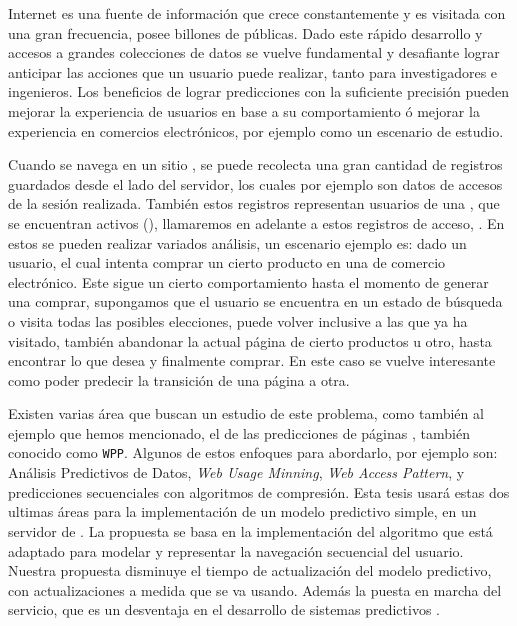 %
%
%
Internet es una fuente de información que crece constantemente y es visitada con una gran frecuencia, posee billones de \webs públicas. Dado este rápido desarrollo y accesos a grandes colecciones de datos se vuelve fundamental y desafiante lograr anticipar las acciones que un usuario puede realizar, tanto para investigadores e ingenieros. Los beneficios de lograr predicciones con la suficiente precisión pueden  mejorar la experiencia de usuarios en base a su comportamiento ó mejorar la experiencia en comercios electrónicos, por ejemplo como un escenario de estudio.

Cuando se navega en un sitio \web, se puede recolecta una gran cantidad de registros guardados desde el lado del servidor, los cuales por ejemplo son datos de accesos de la sesión realizada. También estos registros representan usuarios de una \web, que se encuentran activos (\online), llamaremos en adelante a estos registros de acceso, \webasccesslog. En estos se pueden realizar variados análisis, un escenario ejemplo es: dado un usuario, el cual intenta comprar un cierto producto en una \web de comercio electrónico. Este sigue un cierto comportamiento hasta el momento de generar una comprar, supongamos que el usuario se encuentra en un estado de búsqueda o visita todas las posibles elecciones, puede volver inclusive a las que ya ha visitado, también abandonar la actual página de cierto productos u otro, hasta encontrar lo que desea y finalmente comprar. En este caso se vuelve interesante como poder predecir la transición de una página a otra. 

Existen varias área que buscan un estudio de este problema, como también al ejemplo que hemos mencionado, el de las predicciones de páginas \web, también conocido como \texttt{WPP}. Algunos de estos enfoques para  abordarlo, por ejemplo son:  Análisis Predictivos de Datos, \emph{Web Usage Minning}, \emph{Web Access Pattern}, \machinelearning y predicciones secuenciales con algoritmos de compresión. Esta tesis usará estas dos ultimas áreas para la implementación de un modelo predictivo simple, en un servidor de \machinelearning. La  propuesta se basa en la implementación del algoritmo \lzSieteOcho que está adaptado para modelar y representar la navegación secuencial del usuario. Nuestra propuesta disminuye el tiempo de actualización del modelo predictivo, con actualizaciones a medida que se va usando. Además la puesta en marcha del servicio, que es un desventaja en el desarrollo de sistemas predictivos \online.


